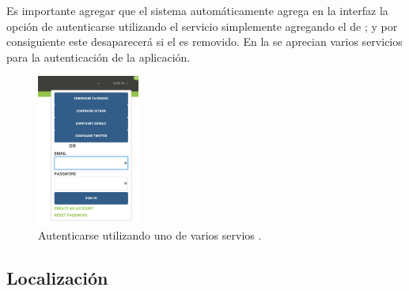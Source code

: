Es importante agregar que el sistema automáticamente agrega en la interfaz la opción de autenticarse utilizando el servicio \thirdParty simplemente agregando el \packagesAS de \meteorNAME; y por consiguiente este desaparecerá si el \packagesAS es removido. En la  se aprecian varios servicios \thirdParty para la autenticación de la aplicación.

\begin{figure}[H]
	\centering
	\includegraphics[width=0.3\textwidth]{figuras/accounts/log_in_all_package.png}

	\caption{Autenticarse utilizando uno de varios servios \thirdParty.}
	\label{figure:account:log_in_all_package}
\end{figure}






\subsection{Localización}

